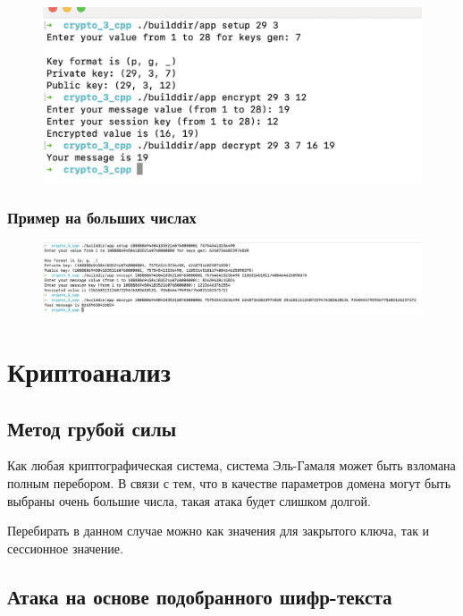 \documentclass[a4paper]{article}
\begin{document}
  \begin{figure}[H]
    \centering
    \includegraphics[width=\textwidth]{15_1}
  \end{figure}

  \subsubsection{Пример на больших числах}

  \begin{figure}[H]
    \centering
    \includegraphics[width=\textwidth]{15_2}
  \end{figure}

  \section{Криптоанализ}

  \subsection{Метод грубой силы}

  Как любая криптографическая система, система Эль-Гамаля может быть взломана полным перебором.
  В связи с тем, что в качестве параметров домена могут быть выбраны очень большие числа, такая
  атака будет слишком долгой.

  Перебирать в данном случае можно как значения для закрытого ключа, так и сессионное значение.

  \subsection{Атака на основе подобранного шифр-текста}
\end{document}
